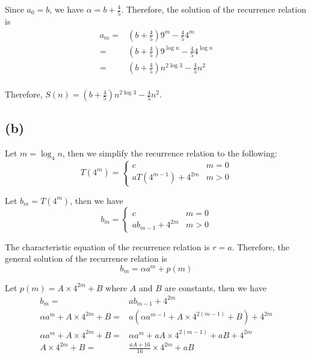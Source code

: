 \documentclass[a4paper,12pt]{article}
\begin{document}
Since $a_0 = b$, we have $\alpha = b + \frac{4}{5}$.
Therefore, the solution of the recurrence relation is
\begin{align*}
	a_m =& \left(b + \frac{4}{5}\right) 9^m - \frac{4}{5} 4^m \\
	=& \left(b + \frac{4}{5}\right) 9^{\log n} - \frac{4}{5} 4^{\log n} \\
	=& \left(b + \frac{4}{5}\right) n^{2\log 3} - \frac{4}{5} n^2 \\
\end{align*}

Therefore, $S(n) = \left(b + \frac{4}{5}\right) n^{2\log 3} - \frac{4}{5} n^2$.

\subsection*{(b)}

Let $m = \log_4 n$, then we simplify the recurrence relation to the following:
\begin{equation*}
	T(4^m) = 
	\begin{cases}
		c & m = 0 \\
		aT(4^{m-1}) + 4^{2m} & m > 0
	\end{cases}
\end{equation*}

Let $b_m = T(4^m)$, then we have
\begin{equation*}
	b_m = 
	\begin{cases}
		c & m = 0 \\
		ab_{m-1} + 4^{2m} & m > 0
	\end{cases}
\end{equation*}

The characteristic equation of the recurrence relation is $r = a$.
Therefore, the general solution of the recurrence relation is
\begin{equation*}
	b_m = \alpha a^m + p(m)
\end{equation*}

Let $p(m) = A \times 4^{2m} + B$ where $A$ and $B$ are constants, then we have
\begin{align*}
	b_m =& ab_{m-1} + 4^{2m} \\
	\alpha a^m + A \times 4^{2m} + B =& a(\alpha a^{m-1} + A \times 4^{2(m-1)} + B) + 4^{2m} \\
	\alpha a^m + A \times 4^{2m} + B =& \alpha a^m + aA \times 4^{2(m-1)} + aB + 4^{2m} \\
	A \times 4^{2m} + B =& \frac{aA + 16}{16} \times 4^{2m} + aB \\
\end{align*}
\end{document}
